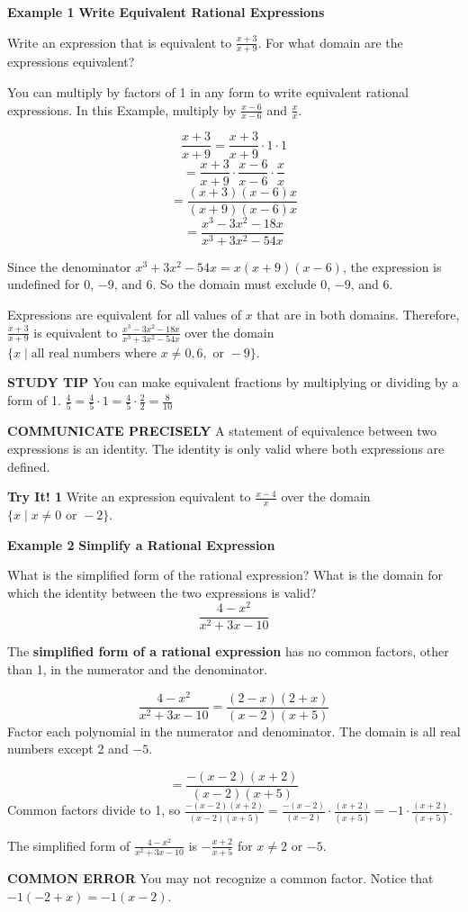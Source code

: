 \documentclass{article}
\newenvironment{example}[1]{\textbf{Example #1}}{\vspace{1em}}
\newenvironment{tryit}[1]{\textbf{Try It! #1}}{\vspace{1em}}
\newcommand{\answer}[1]{}
\begin{document}
\begin{example}{1}
\textbf{Write Equivalent Rational Expressions}

Write an expression that is equivalent to $\frac{x+3}{x+9}$. For what domain are the expressions equivalent?

You can multiply by factors of 1 in any form to write equivalent rational expressions. In this Example, multiply by $\frac{x-6}{x-6}$ and $\frac{x}{x}$.

$$ \frac{x+3}{x+9} = \frac{x+3}{x+9} \cdot 1 \cdot 1 $$
$$ = \frac{x+3}{x+9} \cdot \frac{x-6}{x-6} \cdot \frac{x}{x} $$
$$ = \frac{(x+3)(x-6)x}{(x+9)(x-6)x} $$
$$ = \frac{x^3 - 3x^2 - 18x}{x^3 + 3x^2 - 54x} $$

Since the denominator $x^3 + 3x^2 - 54x = x(x+9)(x-6)$, the expression is undefined for 0, $-9$, and 6. So the domain must exclude 0, $-9$, and 6.

Expressions are equivalent for all values of $x$ that are in both domains. Therefore, $\frac{x+3}{x+9}$ is equivalent to $\frac{x^3 - 3x^2 - 18x}{x^3 + 3x^2 - 54x}$ over the domain $\{x \mid \text{all real numbers where } x \neq 0, 6, \text{ or } -9\}$.

\textbf{STUDY TIP}
You can make equivalent fractions by multiplying or dividing by a form of 1. 
$\frac{4}{5} = \frac{4}{5} \cdot 1 = \frac{4}{5} \cdot \frac{2}{2} = \frac{8}{10}$

\textbf{COMMUNICATE PRECISELY}
A statement of equivalence between two expressions is an identity. The identity is only valid where both expressions are defined.
\end{example}

\begin{tryit}{1}
Write an expression equivalent to $\frac{x-4}{x}$ over the domain $\{x \mid x \neq 0 \text{ or } -2\}$.
\answer{}
\end{tryit}

\begin{example}{2}
\textbf{Simplify a Rational Expression}

What is the simplified form of the rational expression? What is the domain for which the identity between the two expressions is valid?
$$ \frac{4-x^2}{x^2 + 3x - 10} $$

The \textbf{simplified form of a rational expression} has no common factors, other than 1, in the numerator and the denominator.

$$ \frac{4-x^2}{x^2 + 3x - 10} = \frac{(2-x)(2+x)}{(x-2)(x+5)} $$
Factor each polynomial in the numerator and denominator. The domain is all real numbers except 2 and $-5$.

$$ = \frac{-(x-2)(x+2)}{(x-2)(x+5)} $$
Common factors divide to 1, so $\frac{-(x-2)(x+2)}{(x-2)(x+5)} = \frac{-(x-2)}{(x-2)} \cdot \frac{(x+2)}{(x+5)} = -1 \cdot \frac{(x+2)}{(x+5)}$.

The simplified form of $\frac{4-x^2}{x^2 + 3x - 10}$ is $-\frac{x+2}{x+5}$ for $x \neq 2$ or $-5$.

\textbf{COMMON ERROR}
You may not recognize a common factor. Notice that $-1(-2+x) = -1(x-2)$.
\end{example}
\end{document}
